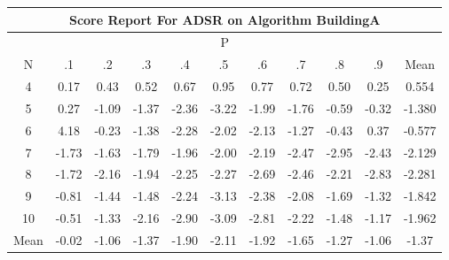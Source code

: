 \documentclass[11pt,a4paper]{report}
\begin{document}
\begin{longtable}{ | c || c | c | c | c | c | c | c | c | c || c |}
\hline
\multicolumn{11}{|c|}{ Score Report For ADSR on Algorithm BuildingA} \\
\hline
\multicolumn{11}{|c|}{ P } \\
\hline
N & .1 & .2 & .3 & .4 & .5 & .6 & .7 & .8 & .9 & Mean\\
 \hline
 \hline
 \endhead
  4 &  \cellcolor[HTML]{F7F7FF} 0.17 &  \cellcolor[HTML]{F7F7FF} 0.43 &  \cellcolor[HTML]{EFEFFF} 0.52 &  \cellcolor[HTML]{EFEFFF} 0.67 &  \cellcolor[HTML]{E7E7FF} 0.95 &  \cellcolor[HTML]{EFEFFF} 0.77 &  \cellcolor[HTML]{EFEFFF} 0.72 &  \cellcolor[HTML]{EFEFFF} 0.50 &  \cellcolor[HTML]{F7F7FF} 0.25 & 0.554 \\
  5 &  \cellcolor[HTML]{F7F7FF} 0.27 &  \cellcolor[HTML]{FFE7E7} -1.09 &  \cellcolor[HTML]{FFDFDF} -1.37 &  \cellcolor[HTML]{FFC7C7} -2.36 &  \cellcolor[HTML]{FFAFAF} -3.22 &  \cellcolor[HTML]{FFCFCF} -1.99 &  \cellcolor[HTML]{FFCFCF} -1.76 &  \cellcolor[HTML]{FFEFEF} -0.59 &  \cellcolor[HTML]{FFF7F7} -0.32 & -1.380 \\
  6 &  \cellcolor[HTML]{9797FF} 4.18 &  \cellcolor[HTML]{FFF7F7} -0.23 &  \cellcolor[HTML]{FFDFDF} -1.38 &  \cellcolor[HTML]{FFC7C7} -2.28 &  \cellcolor[HTML]{FFCFCF} -2.02 &  \cellcolor[HTML]{FFC7C7} -2.13 &  \cellcolor[HTML]{FFDFDF} -1.27 &  \cellcolor[HTML]{FFF7F7} -0.43 &  \cellcolor[HTML]{F7F7FF} 0.37 & -0.577 \\
  7 &  \cellcolor[HTML]{FFD7D7} -1.73 &  \cellcolor[HTML]{FFD7D7} -1.63 &  \cellcolor[HTML]{FFCFCF} -1.79 &  \cellcolor[HTML]{FFCFCF} -1.96 &  \cellcolor[HTML]{FFCFCF} -2.00 &  \cellcolor[HTML]{FFC7C7} -2.19 &  \cellcolor[HTML]{FFBFBF} -2.47 &  \cellcolor[HTML]{FFB7B7} -2.95 &  \cellcolor[HTML]{FFBFBF} -2.43 & -2.129 \\
  8 &  \cellcolor[HTML]{FFD7D7} -1.72 &  \cellcolor[HTML]{FFC7C7} -2.16 &  \cellcolor[HTML]{FFCFCF} -1.94 &  \cellcolor[HTML]{FFC7C7} -2.25 &  \cellcolor[HTML]{FFC7C7} -2.27 &  \cellcolor[HTML]{FFBFBF} -2.69 &  \cellcolor[HTML]{FFBFBF} -2.46 &  \cellcolor[HTML]{FFC7C7} -2.21 &  \cellcolor[HTML]{FFB7B7} -2.83 & -2.281 \\
  9 &  \cellcolor[HTML]{FFE7E7} -0.81 &  \cellcolor[HTML]{FFD7D7} -1.44 &  \cellcolor[HTML]{FFD7D7} -1.48 &  \cellcolor[HTML]{FFC7C7} -2.24 &  \cellcolor[HTML]{FFAFAF} -3.13 &  \cellcolor[HTML]{FFC7C7} -2.38 &  \cellcolor[HTML]{FFC7C7} -2.08 &  \cellcolor[HTML]{FFD7D7} -1.69 &  \cellcolor[HTML]{FFDFDF} -1.32 & -1.842 \\
  10 &  \cellcolor[HTML]{FFEFEF} -0.51 &  \cellcolor[HTML]{FFDFDF} -1.33 &  \cellcolor[HTML]{FFC7C7} -2.16 &  \cellcolor[HTML]{FFB7B7} -2.90 &  \cellcolor[HTML]{FFAFAF} -3.09 &  \cellcolor[HTML]{FFB7B7} -2.81 &  \cellcolor[HTML]{FFC7C7} -2.22 &  \cellcolor[HTML]{FFD7D7} -1.48 &  \cellcolor[HTML]{FFDFDF} -1.17 & -1.962 \\
 \hline
 \hline
Mean &  \cellcolor[HTML]{FFFFFF} -0.02 &  \cellcolor[HTML]{FFE7E7} -1.06 &  \cellcolor[HTML]{FFDFDF} -1.37 &  \cellcolor[HTML]{FFCFCF} -1.90 &  \cellcolor[HTML]{FFC7C7} -2.11 &  \cellcolor[HTML]{FFCFCF} -1.92 &  \cellcolor[HTML]{FFD7D7} -1.65 &  \cellcolor[HTML]{FFDFDF} -1.27 &  \cellcolor[HTML]{FFE7E7} -1.06 &  \cellcolor[HTML]{FFDFDF} -1.37
\end{longtable}
\end{document}
